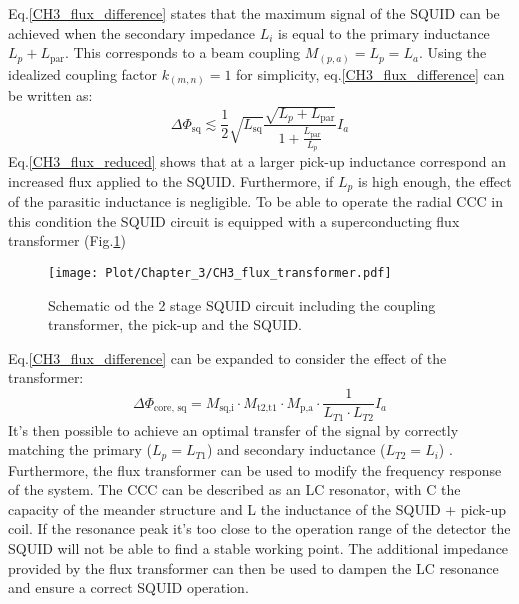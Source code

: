 \documentclass[12pt,a4paper]{report}
\begin{document}
       Eq.\ref{CH3_flux_difference} states that the maximum signal of the SQUID can be achieved when the secondary impedance \(L_i\) is equal to the primary inductance \(L_p + L_{\text{par}}\). This corresponds to a beam coupling \(M_{(p,a)} = L_p = L_a\). Using the idealized coupling factor \(k_{(m,n)} = 1\) for simplicity, eq.\ref{CH3_flux_difference} can be written as:
       \begin{equation}
       	\Delta \Phi_{\text{sq}} \lesssim \frac{1}{2} \sqrt{L_{\text{sq}}} \frac{\sqrt{L_p + L_{\text{par}}}}{1 + \frac{L_{\text{par}}}{L_p}} I_a
       	\label{CH3_flux_reduced}
       \end{equation}
       Eq.\ref{CH3_flux_reduced} shows that at a larger pick-up inductance correspond an increased flux applied to the SQUID. Furthermore, if $L_p$ is high enough, the effect of the parasitic inductance is negligible. To be able to operate the radial CCC in this condition the SQUID circuit is equipped with a superconducting flux transformer (Fig.\ref{CH3_flux_transformer})
       \begin{figure} [H]
       	\centering
       	\texttt{[image: Plot/Chapter\_3/CH3\_flux\_transformer.pdf]}
       	\caption{\small{Schematic od the 2 stage SQUID circuit including the coupling transformer, the pick-up and the SQUID.}}
       	\label{CH3_flux_transformer}
       \end{figure}
       Eq.\ref{CH3_flux_difference} can be expanded to consider the effect of the transformer:
       \begin{equation}
       		\Delta \Phi_{\text{core, sq}} = M_{\text{sq,i}} \cdot M_{\text{t2,t1}} \cdot M_{\text{p,a}} \cdot \frac{1}{L_{T1} \cdot L_{T2}} I_a
       \end{equation}
       It's then possible to achieve an optimal transfer of the signal by correctly matching the primary ($L_p=L_{T1}$) and secondary inductance ($L_{T2} = L_i$) \cite{Tympel:IBIC2017-WEPCF07}. Furthermore, the flux transformer can be used to modify the frequency response of the system. The CCC can be described as an LC resonator, with C the capacity of the meander structure and L the inductance of the SQUID + pick-up coil. If the resonance peak it's too close to the operation range of the detector the SQUID will not be able to find a stable working point. The additional impedance provided by the flux transformer can then be used to dampen the LC resonance and ensure a correct SQUID operation.
\end{document}
